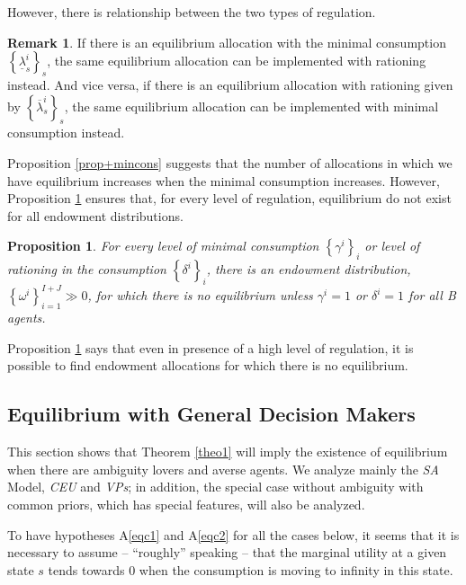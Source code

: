 \documentclass[pdftex]{article}
\numberwithin{equation}{section}
\theoremstyle{th}
\newtheorem{prop}{{Proposition}}%
\newtheorem{proof lemma}{{Proof Lemma}.}
\theoremstyle{definition}
\newtheorem{remark}{Remark}%
\newtheorem*{risk lovers}{Risk lovers}
\newtheorem*{risk averse}{Risk averse}
\begin{document}
However, there is relationship between the two types of regulation.
\begin{remark}
{If there is an equilibrium allocation with the minimal consumption $\left\{\underline{\lambda}^i_s\right\}_s$, the same equilibrium allocation can be implemented with rationing instead. And vice versa, if there is an equilibrium allocation with rationing given by $\left\{\overline{\lambda}^i_s\right\}_s$, the same equilibrium allocation can be implemented with minimal consumption instead.}
\end{remark}




Proposition \ref{prop+mincons} suggests that the number of allocations in which we have equilibrium increases when the minimal consumption increases. {However, Proposition \ref{propnoexistence} ensures that, for every level of regulation, equilibrium do not exist for all endowment distributions.}

\begin{prop}
\label{propnoexistence}
For every level of minimal consumption $\left\{\gamma^i\right\}_i$ or level of rationing in the consumption $\left\{\delta^i\right\}_i$, there is an endowment distribution, $\left\{\omega^i\right\}_{i=1}^{I+J}\gg0$, for which there is no equilibrium unless $\gamma^i=1$ or $\delta^i=1$ for all \emph{B} agents.
\end{prop}

Proposition \ref{propnoexistence} says that even in presence of a high level of regulation, it is possible to find endowment allocations for which there is no equilibrium.%




\subsection{Equilibrium with General Decision Makers}
\label{subsection3}
This section shows that Theorem \ref{theo1} will imply the existence of equilibrium when there are ambiguity lovers and averse agents. We analyze mainly the \emph{SA} Model, \emph{CEU} and \emph{VPs}; in addition, the special case without ambiguity with common priors, which has special features, will also be analyzed.

To have  hypotheses A\ref{eqc1} and A\ref{eqc2} for all the cases below, it seems that it is necessary to assume -- ``roughly'' speaking -- that the marginal utility at a given state $s$ tends towards $0$ when the consumption is moving to infinity in this state.
\end{document}
